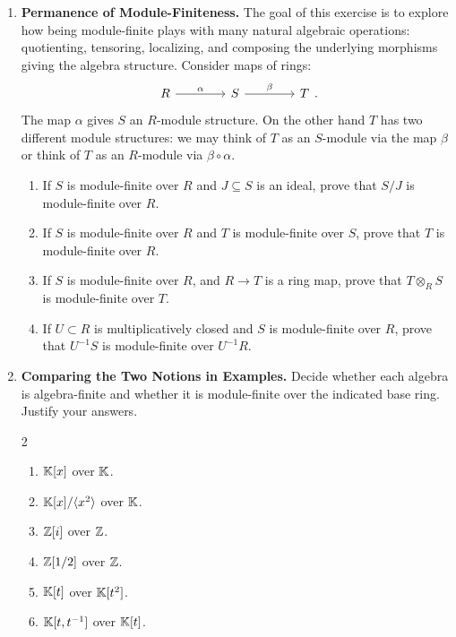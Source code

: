 \documentclass[12pt,reqno]{amsart}
\begin{document}
\begin{enumerate}[leftmargin=*, resume=problems]
\item \textbf{Permanence of Module-Finiteness.} The goal of this exercise is to explore how being module-finite plays with many natural algebraic operations: quotienting, tensoring, localizing, and composing the underlying morphisms giving the algebra structure. Consider maps of rings:
\[
\begin{tikzcd}[row sep = .3em, column sep = 4em]
R \arrow[r, "\alpha"] & S \arrow[r, "\beta"] & T
\end{tikzcd}.
\]
The map $\alpha$ gives $S$ an $R$-module structure. On the other hand $T$ has two different module structures: we may think of $T$ as an $S$-module via the map $\beta$ or think of $T$ as an $R$-module via $\beta\circ\alpha$. 
\begin{enumerate}
    \item If $S$ is module-finite over $R$ and $J\subseteq S$ is an ideal, prove that $S/J$ is module-finite over $R$.
    \item If $S$ is module-finite over $R$ and $T$ is module-finite over $S$, prove that $T$ is module-finite over $R$.
    \item If $S$ is module-finite over $R$, and $R\to T$ is a ring map, prove that $T\otimes_R S$ is module-finite over $T$.
    \item If $U\subset R$ is multiplicatively closed and $S$ is module-finite over $R$, prove that $U^{-1}S$ is module-finite over $U^{-1}R$.
\end{enumerate}

\item \textbf{Comparing the Two Notions in Examples.} Decide whether each algebra is algebra-finite and whether it is module-finite over the indicated base ring. Justify your answers.
\begin{multicols}{2}
\begin{enumerate}
    \item $\mathbb{K}[x]$ over $\mathbb{K}$.
    \item $\mathbb{K}[x]/\langle x^2\rangle$ over $\mathbb{K}$.
    \item $\mathbb{Z}[i]$ over $\mathbb{Z}$.
    \item $\mathbb{Z}[1/2]$ over $\mathbb{Z}$.
    \item $\mathbb{K}[t]$ over $\mathbb{K}[t^2]$.
    \item $\mathbb{K}[t,t^{-1}]$ over $\mathbb{K}[t]$.
\end{enumerate}
\end{multicols}

\end{enumerate}
\end{document}
